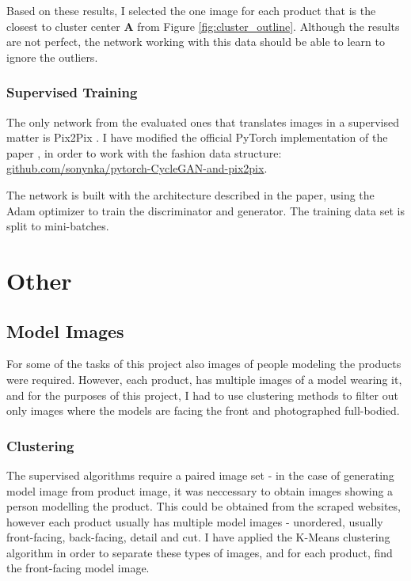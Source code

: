 \documentclass{article}
\begin{document}
Based on these results, I selected the one image for each product that is the closest to cluster center \textbf{A} from Figure \ref{fig:cluster_outline}. Although the results are not perfect, the network working with this data should be able to learn to ignore the outliers.

\pagebreak
\subsubsection{Supervised Training}
The only network from the evaluated ones that translates images in a supervised matter is Pix2Pix \cite{isola_image--image_2016}. I have modified the official PyTorch implementation of the paper \cite{noauthor_junyanz/pytorch-cyclegan-and-pix2pix_nodate}, in order to work with the fashion data structure: \hyperlink{https://github.com/sonynka/pytorch-CycleGAN-and-pix2pix}{github.com/sonynka/pytorch-CycleGAN-and-pix2pix}.

The network is built with the architecture described in the paper, using the Adam optimizer \cite{kingma_adam_2014} to train the discriminator and generator. The training data set is split to mini-batches.




\pagebreak
\section{Other}

\subsection{Model Images}
For some of the tasks of this project also images of people modeling the products were required.  However, each product, has multiple images of a model wearing it, and for the purposes of this project, I had to use clustering methods to filter out only images where the models are facing the front and photographed full-bodied.

\subsubsection{Clustering}
The supervised algorithms require a paired image set - in the case of generating model image from product image, it was neccessary to obtain images showing a person modelling the product. This could be obtained from the scraped websites, however each product usually has multiple model images - unordered, usually front-facing, back-facing, detail and cut. I have applied the K-Means clustering algorithm in order to separate these types of images, and for each product, find the front-facing model image.
\end{document}
